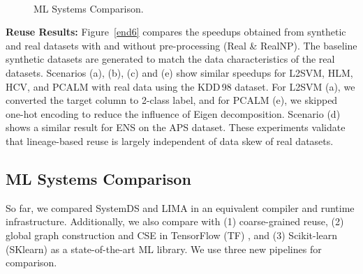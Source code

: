 \begin{figure}[!t]
	\centering
	\hfill
	~\vspace{-0.2cm}\\
	\hfill
	\hfill
	\vspace{-0.45cm}
	\caption{\label{fig:mlsys}ML Systems Comparison.}
\end{figure}

\textbf{Reuse Results:} Figure~\ref{end6} compares the speedups obtained from synthetic and real datasets with and without pre-processing (Real \& RealNP). The baseline synthetic datasets are generated to match the data characteristics of the real datasets. Scenarios (a), (b), (c) and (e) show similar speedups for L2SVM, HLM, HCV, and PCALM with real data using the KDD\,98 dataset. For L2SVM (a), we converted the target column to 2-class label, and for PCALM (e), we skipped one-hot encoding to reduce the influence of Eigen decomposition. Scenario (d) shows a similar result for ENS on the APS dataset. These experiments validate that lineage-based reuse is largely independent of data skew of real datasets.

\subsection{ML Systems Comparison} 
\label{sec:syscomp}

So far, we compared SystemDS and LIMA in an equivalent compiler and runtime infrastructure. Additionally, we also compare with (1) coarse-grained reuse, (2) global graph construction and CSE in TensorFlow (TF) \cite{AbadiBCCDDDGIIK16,abs-1810-08061}, and (3) Scikit-learn (SKlearn) \cite{PedregosaVGMTGBPWDVPCBPD11} as a state-of-the-art ML library. We use three new pipelines for comparison.

